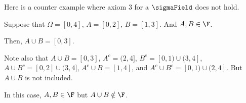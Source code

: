 
Here is a counter example where axiom 3 for a $\sigmaField$ does not hold.

Suppose that $\Omega=[0,4]$, $A=[0,2]$, $B=[1, 3]$. And $A,B \in \F$.

Then, $A\cup B = [0,3]$.

Note also that $A \cup B = [0,3]$,  $A^c = (2,4]$, $B^c = [0,1) \cup (3,4]$,
$A \cup B^c = [0,2] \cup (3,4]$, $A^c \cup B = [1,4]$, 
and $A^c \cup B^c = [0,1) \cup (2,4]$. But $A\cup B$ is not included.

In this case, $A,B \in \F$ but $A\cup B \notin \F$.
